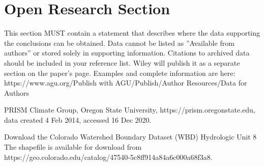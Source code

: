 \documentclass[draft]{agujournal2019}
\begin{document}
%








%
%

\section*{Open Research Section}
This section MUST contain a statement that describes where the data supporting the conclusions can be obtained. Data cannot be listed as ''Available from authors'' or stored solely in supporting information. Citations to archived data should be included in your reference list. Wiley will publish it as a separate section on the paper’s page. Examples and complete information are here:
https://www.agu.org/Publish with AGU/Publish/Author Resources/Data for Authors

PRISM Climate Group, Oregon State University, https://prism.oregonstate.edu, data created 4 Feb 2014, accessed 16 Dec 2020.

Download the Colorado Watershed Boundary Dataset (WBD) Hydrologic Unit 8
The shapefile is available for download from https://geo.colorado.edu/catalog/47540-5c8ff914a84a6c000a68f3a8.
\end{document}
